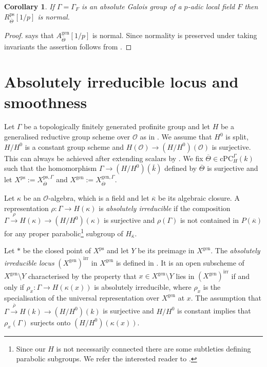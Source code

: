 \documentclass{amsart}
\newtheorem{cor}[prop]{Corollary}
\theoremstyle{definition}
\theoremstyle{remark}
\newcommand{\OO}{\mathcal O}
\newcommand{\rhobar}{\overline{\rho}}
\newcommand{\gen}{\mathrm{gen}}
\newcommand{\irr}{\mathrm{irr}}
\newcommand{\kappabar}{\overline{\kappa}}
\newcommand{\kbar}{\bar{k}}
\newcommand{\cPC}{\mathrm{cPC}}
\newcommand{\Thetabar}{\overline{\Theta}}
\newcommand{\ps}{\mathrm{ps}}
\begin{document}
\begin{cor}\label{normal}
    If $\Gamma=\Gamma_F$ is an absolute Galois group of a $p$-adic local field $F$ then $R^{\ps}_{\Thetabar}[1/p]$ is normal.
\end{cor}

\begin{proof}
    \cite[Corollary 15.23]{defG} says 
    that $A^{\gen}_{\Thetabar}[1/p]$ is normal. Since normality is preserved under taking invariants the assertion follows from .
\end{proof}

\section{Absolutely irreducible locus and smoothness}\label{sec_abs_irr}
Let $\Gamma$ be a topologically finitely generated profinite group and 
let $H$ be a generalised reductive group scheme over $\OO$ as in . We assume that 
$H^0$ is split, $H/H^0$ is a constant group scheme and $H(\OO)\rightarrow (H/H^0)(\OO)$ is surjective. This can always be achieved after extending scalars 
by \cite[Proposition 2.8]{defG}. We fix $\Thetabar\in \cPC^{\Gamma}_H(k)$ such that the homomorphism $\Gamma \to (H/H^0)(\kbar)$ defined by $\Thetabar$ is surjective and let $X^{\ps}:= X^{\ps, \Gamma}_{\Thetabar}$ and $X^{\gen}:= X^{\gen, \Gamma}_{\Thetabar}$.

Let $\kappa$ 
be an $\OO$-algebra, which is a field and let $\overline{\kappa}$ 
be its algebraic closure. A representation $\rho: \Gamma\rightarrow H(\kappa)$ is \textit{absolutely irreducible} if the composition $\Gamma \overset{\rho}{\longrightarrow} H(\kappa)\rightarrow (H/H^0)(\kappa)$ is surjective and  
 $\rho(\Gamma)$ is not contained
in $P(\overline{\kappa})$ for any proper 
parabolic\footnote{Since our $H$ is not
 necessarily connected there are some subtleties defining parabolic subgroups. 
 We refer the interested reader to \cite[Section 2.1, Example 9.14]{defG}.} subgroup of $H_{\kappabar}$. 
 
 Let $\ast$ be the closed point of $X^{\ps}$ and let 
 $Y$ be its preimage in $X^{\gen}$. The \textit{absolutely irreducible 
 locus} $(X^{\gen})^{\irr}$ in $X^{\gen}$ is defined in \cite[Definition 9.12]{defG}. It is
 an open subscheme of $X^{\gen}\setminus Y$ characterised by the property 
 that $x\in X^{\gen}\setminus Y$ lies in $(X^{\gen})^{\irr}$
 if and only if $\rho_x: \Gamma \rightarrow H(\kappa(x))$ is absolutely irreducible, where
  $\rho_x$ is  the specialisation of the universal representation 
over $X^{\gen}$ at $x$.
 The assumption that 
 $\Gamma \overset{\rhobar}{\longrightarrow} H(k) 
 \rightarrow (H/H^0)(k)$ is surjective and $H/H^0$ is constant implies that $\rho_x(\Gamma)$ surjects onto $(H/H^0)(\kappa(x))$. 
 
\end{document}
